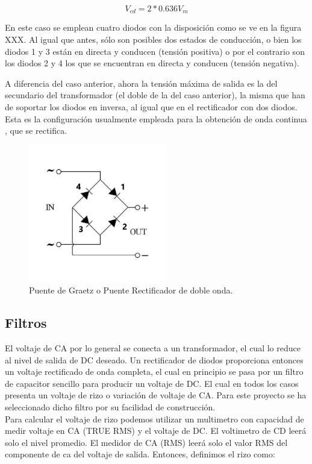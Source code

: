 \begin{equation}\label{eq:ej}
V_{cd}=2*0.636V_{m}
\end{equation}

En este caso se emplean cuatro diodos con la disposición como se ve en la figura XXX. Al igual que antes, sólo son posibles dos estados de conducción, o bien los diodos 1 y 3 están en directa y conducen (tensión positiva) o por el contrario son los diodos 2 y 4 los que se encuentran en directa y conducen (tensión negativa).

A diferencia del caso anterior, ahora la tensión máxima de salida es la del secundario del transformador (el doble de la del caso anterior), la misma que han de soportar los diodos en inversa, al igual que en el rectificador con dos diodos. Esta es la configuración usualmente empleada para la obtención de onda continua , que se rectifica.

\begin{figure}[H]
\centering
\includegraphics[width=6cm]{capitulo2/figs/Puente_de_diodos.png}
\caption{Puente de Graetz o Puente Rectificador de doble onda.}
\end{figure}


\subsection{Filtros}
El voltaje de CA por lo general se conecta a un transformador, el cual lo reduce al nivel de salida de DC deseado. Un rectificador de diodos proporciona entonces un voltaje rectificado de onda completa, el cual en principio se pasa por un filtro de capacitor sencillo para producir un voltaje de DC. El cual en todos los casos presenta un voltaje de rizo o variación de voltaje de CA. Para este proyecto se ha seleccionado dicho filtro por su facilidad de construcción. \\

Para calcular el voltaje de rizo podemos utilizar un multimetro con capacidad de medir voltaje en CA (TRUE RMS) y el voltaje de DC. El voltimetro de CD leerá solo el nivel promedio. El medidor de CA (RMS) leerá solo el valor RMS del componente de ca del voltaje de salida. Entonces, definimos el rizo como:\\

